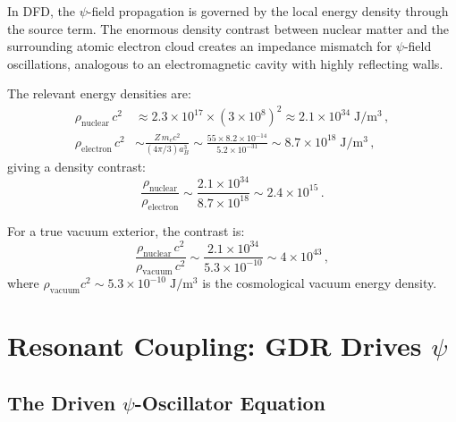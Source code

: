 \documentclass[aps,prd,twocolumn,superscriptaddress,nofootinbib]{revtex4-2}
\newcommand{\ee}[1]{\times 10^{#1}}
\begin{document}
In DFD, the $\psi$-field propagation is governed by the local
energy density through the source term.  The enormous density
contrast between nuclear matter and the surrounding atomic electron
cloud creates an impedance mismatch for $\psi$-field oscillations,
analogous to an electromagnetic cavity with highly reflecting walls.

The relevant energy densities are:
\begin{align}
\rho_{\mathrm{nuclear}}\,c^2 &\approx 2.3\ee{17} \times (3\ee{8})^2
\approx 2.1\ee{34}\;\mathrm{J/m^3}\,,
\label{eq:rho-nuc}\\
\rho_{\mathrm{electron}}\,c^2 &\sim \frac{Z\,m_e c^2}{(4\pi/3)a_B^3}
\sim \frac{55 \times 8.2\ee{-14}}{5.2\ee{-31}}
\sim 8.7\ee{18}\;\mathrm{J/m^3}\,,
\label{eq:rho-elec}
\end{align}
giving a density contrast:
\begin{equation}\label{eq:contrast}
\frac{\rho_{\mathrm{nuclear}}}{\rho_{\mathrm{electron}}}
\sim \frac{2.1\ee{34}}{8.7\ee{18}} \sim 2.4\ee{15}\,.
\end{equation}

For a true vacuum exterior, the contrast is:
\begin{equation}\label{eq:contrast-vac}
\frac{\rho_{\mathrm{nuclear}}\,c^2}{\rho_{\mathrm{vacuum}}\,c^2}
\sim \frac{2.1\ee{34}}{5.3\ee{-10}} \sim 4\ee{43}\,,
\end{equation}
where $\rho_{\mathrm{vacuum}}c^2 \sim 5.3\ee{-10}\;\mathrm{J/m^3}$
is the cosmological vacuum energy density.


\section{Resonant Coupling: GDR Drives $\psi$}
\label{sec:resonance}

\subsection{The Driven $\psi$-Oscillator Equation}
\label{sec:driven}
\end{document}
